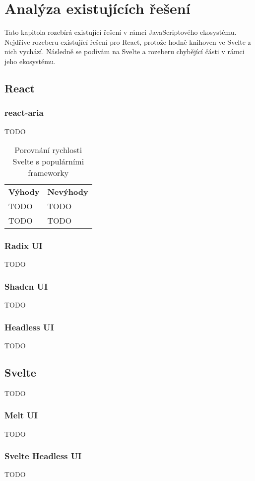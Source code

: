 \chapter{Analýza existujících řešení}

Tato kapitola rozebírá existující řešení v rámci JavaScriptového ekosystému.
Nejdříve rozeberu existující řešení pro React, protože hodně knihoven ve Svelte z nich vychází.
Následně se podívám na Svelte a rozeberu chybějící části v rámci jeho ekosystému.

\section{React}

\subsection{react-aria}

TODO

\begin{table}[ht]
    \begin{ctucolortab}
        \begin{tabularx}{\textwidth}{Y Y}
            \bfseries \textcolor{OK}{Výhody} & \bfseries \textcolor{NOT_OK}{Nevýhody} \\\Midrule{}
            TODO                             & TODO                                   \\
            TODO                             & TODO
        \end{tabularx}
    \end{ctucolortab}
    \caption{Porovnání rychlosti Svelte s populárními frameworky}
    \label{tab:foobar}
\end{table}

\subsection{Radix UI}

TODO

\subsection{Shadcn UI}

TODO

\subsection{Headless UI}

TODO

\section{Svelte}

TODO

\subsection{Melt UI}

TODO

\subsection{Svelte Headless UI}

TODO
